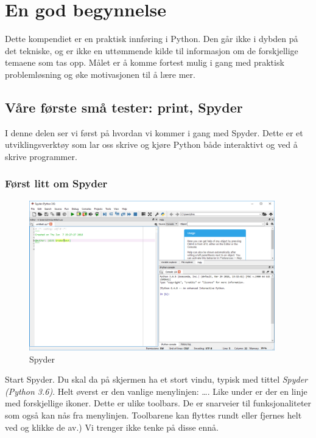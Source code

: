 \chapter{En god begynnelse}
Dette kompendiet er en praktisk innføring i Python. Den går ikke i dybden på det tekniske, og er ikke en uttømmende kilde til informasjon om de forskjellige temaene som tas opp. Målet er å komme fortest mulig i gang med praktisk problemløsning og øke motivasjonen til å lære mer.

\section{Våre første små tester: print, Spyder}

I denne delen ser vi først på hvordan vi kommer i gang med Spyder. Dette er et utviklingsverktøy som lar oss skrive og kjøre Python både interaktivt og ved å skrive programmer. 

\subsection*{Først litt om Spyder}
\begin{figure}[t]
\begin{center}
\includegraphics[width=0.95\textwidth]{img/spyder_overview.png}
\end{center}
\caption{Spyder}
\label{fig:spyder_overview}
\end{figure}

Start Spyder. Du skal da på skjermen ha et stort vindu, typisk med tittel \emph{Spyder (Python 3.6)}. Helt øverst er den vanlige menylinjen:   \ldots. Like under er der en linje med forskjellige ikoner. Dette er ulike toolbars. De er snarveier til funksjonaliteter som også kan nås fra menylinjen. Toolbarene kan flyttes rundt eller fjernes helt ved  og klikke de av.) Vi trenger ikke tenke på disse ennå. 

